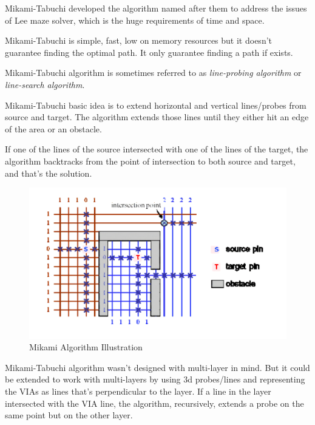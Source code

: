 Mikami-Tabuchi developed the algorithm named after them \cite{mikami1968computer} to address the issues of Lee maze solver, which is the huge requirements of time and space.

Mikami-Tabuchi is simple, fast, low on memory resources but it doesn't guarantee finding the optimal path. It only guarantee finding a path if exists.

Mikami-Tabuchi algorithm is sometimes referred to as \textit{line-probing algorithm} or \textit{line-search algorithm}.

Mikami-Tabuchi basic idea is to extend horizontal and vertical lines/probes from source and target. The algorithm extends those lines until they either hit an edge of the area or an obstacle.

If one of the lines of the source intersected with one of the lines of the target, the algorithm backtracks from the point of intersection to both source and target, and that's the solution.

\begin{figure}
    \centering
    \includegraphics[width=\linewidth]{figures/mikami.png}
    \caption{Mikami Algorithm Illustration \cite{chen2009global}}
    \label{fig:mikamiIllustr}
\end{figure}

Mikami-Tabuchi algorithm wasn't designed with multi-layer in mind. But it could be extended to work with multi-layers by using 3d probes/lines and representing the VIAs as lines that's perpendicular to the layer. If a line in the layer intersected with the VIA line, the algorithm, recursively, extends a probe on the same point but on the other layer.

